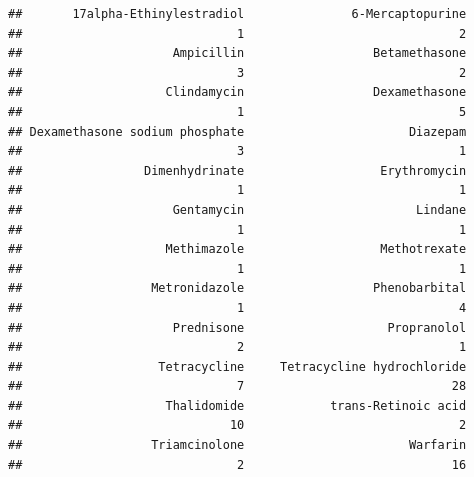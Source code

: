 \documentclass[12pt,]{article}
\begin{document}
\begin{verbatim}
##       17alpha-Ethinylestradiol               6-Mercaptopurine 
##                              1                              2 
##                     Ampicillin                  Betamethasone 
##                              3                              2 
##                    Clindamycin                  Dexamethasone 
##                              1                              5 
## Dexamethasone sodium phosphate                       Diazepam 
##                              3                              1 
##                 Dimenhydrinate                   Erythromycin 
##                              1                              1 
##                     Gentamycin                        Lindane 
##                              1                              1 
##                    Methimazole                   Methotrexate 
##                              1                              1 
##                  Metronidazole                  Phenobarbital 
##                              1                              4 
##                     Prednisone                    Propranolol 
##                              2                              1 
##                   Tetracycline     Tetracycline hydrochloride 
##                              7                             28 
##                    Thalidomide            trans-Retinoic acid 
##                             10                              2 
##                  Triamcinolone                       Warfarin 
##                              2                             16
\end{verbatim}
\end{document}
